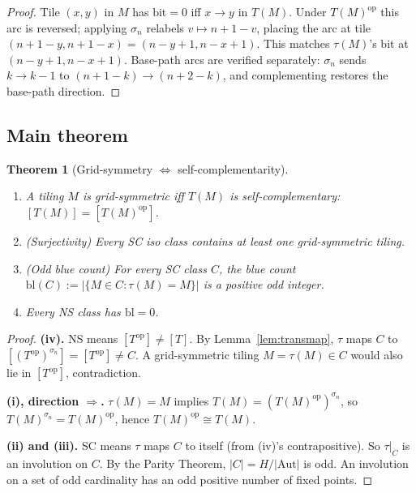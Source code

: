 \documentclass[12pt,reqno]{amsart}
\newtheorem{theorem}{Theorem}[section]
\theoremstyle{definition}
\theoremstyle{plain}
\begin{document}
\begin{proof}
Tile $(x,y)$ in $M$ has $\mathrm{bit}=0$ iff $x\to y$ in $T(M)$.
Under $T(M)^{\mathrm{op}}$ this arc is reversed; applying $\sigma_n$ relabels
$v\mapsto n+1-v$, placing the arc at tile $(n+1-y,n+1-x)=(n-y+1,n-x+1)$.
This matches $\tau(M)$'s bit at $(n-y+1,n-x+1)$.
Base-path arcs are verified separately: $\sigma_n$ sends $k\to k-1$ to
$(n+1-k)\to(n+2-k)$, and complementing restores the base-path direction.
\end{proof}

\subsection{Main theorem}

\begin{theorem}[Grid-symmetry $\Leftrightarrow$ self-complementarity]
\label{thm:gridsym-sc}
\mbox{}
\begin{enumerate}[label=\textup{(\roman*)}]
\item A tiling $M$ is grid-symmetric iff $T(M)$ is self-complementary:
  $[T(M)]=[T(M)^{\mathrm{op}}]$.
\item \emph{(Surjectivity)} Every SC iso class contains at least one
  grid-symmetric tiling.
\item \emph{(Odd blue count)} For every SC class $C$, the blue count
  $\mathrm{bl}(C):=|\{M\in C:\tau(M)=M\}|$ is a positive odd integer.
\item Every NS class has $\mathrm{bl}=0$.
\end{enumerate}
\end{theorem}

\begin{proof}
\textbf{(iv).} NS means $[T^{\mathrm{op}}]\ne[T]$.
By Lemma~\ref{lem:transmap}, $\tau$ maps $C$ to $[(T^{\mathrm{op}})^{\sigma_n}]=[T^{\mathrm{op}}]\ne C$.
A grid-symmetric tiling $M=\tau(M)\in C$ would also lie in $[T^{\mathrm{op}}]$, contradiction.

\textbf{(i), direction $\Rightarrow$.}
$\tau(M)=M$ implies $T(M)=(T(M)^{\mathrm{op}})^{\sigma_n}$,
so $T(M)^{\sigma_n}=T(M)^{\mathrm{op}}$, hence $T(M)^{\mathrm{op}}\cong T(M)$.

\textbf{(ii) and (iii).}
SC means $\tau$ maps $C$ to itself (from (iv)'s contrapositive).
So $\tau|_C$ is an involution on $C$.
By the Parity Theorem, $|C|=H/|\mathrm{Aut}|$ is odd.
An involution on a set of odd cardinality has an odd positive number of fixed points.
\end{proof}
\end{document}
